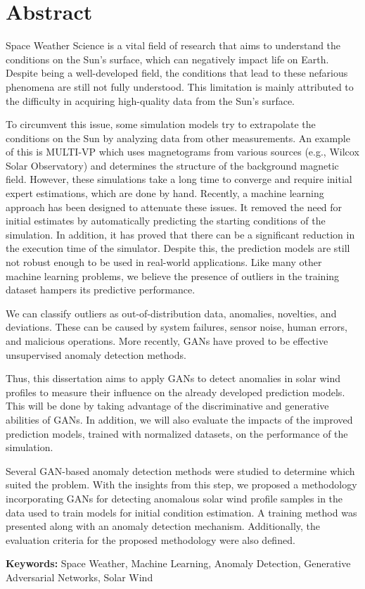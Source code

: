 \chapter*{Abstract}
Space Weather Science is a vital field of research that aims to understand the conditions on the Sun's surface, which can negatively impact life on Earth. Despite being a well-developed field, the conditions that lead to these nefarious phenomena are still not fully understood. This limitation is mainly attributed to the difficulty in acquiring high-quality data from the Sun's surface.

To circumvent this issue, some simulation models try to extrapolate the conditions on the
Sun by analyzing data from other measurements. An example of this is MULTI-VP which
uses magnetograms from various sources (e.g., Wilcox Solar Observatory) and determines the
structure of the background magnetic field. However, these simulations take a long time to converge and require initial expert estimations, which are done by hand. Recently, a machine learning approach has been designed to attenuate these issues. It removed the need for initial estimates by automatically predicting the starting conditions of the simulation. In addition, it has proved that there can be a significant reduction in the execution time of the simulator. Despite this, the prediction models are still not robust enough to be used in real-world applications. Like many other machine learning problems, we believe the presence of outliers in the training dataset hampers its predictive performance.

We can classify outliers as out-of-distribution data, anomalies, novelties, and deviations. These can be caused by system failures, sensor noise, human errors, and malicious operations. More recently, GANs have proved to be effective unsupervised anomaly detection methods.

Thus, this dissertation aims to apply GANs to detect anomalies in solar wind profiles to measure
their influence on the already developed prediction models. This will be done by taking
advantage of the discriminative and generative abilities of GANs. In addition, we will also evaluate the impacts of the improved prediction models, trained with normalized datasets, on the performance of the simulation.

Several GAN-based anomaly detection methods were studied to determine which suited the problem. With the insights from this step, we proposed a methodology incorporating GANs for detecting anomalous solar wind profile samples in the data used to train models for initial condition estimation. A training method was presented along with an anomaly detection mechanism. Additionally, the evaluation criteria for the proposed methodology were also defined.

\vspace{1cm}
\noindent\textbf{Keywords:} Space Weather, Machine Learning, Anomaly Detection, Generative Adversarial Networks, Solar Wind